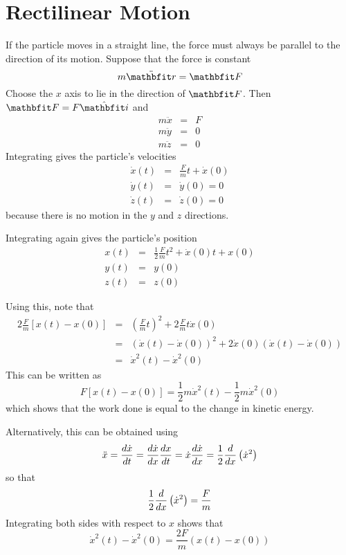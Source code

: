 \section{Rectilinear Motion}

If the particle moves in a straight line, the force must always be parallel
to the direction of its motion.  Suppose that the force is constant
$$m\ddot{\vect{r}}=\vect{F}$$
Choose the $x$ axis to lie in the direction of $\vect{F}$.  Then
$\vect{F}=F\ivect$ and
\begin{eqnarray*}
m\ddot{x}&=&F\\
m\ddot{y}&=&0\\
m\ddot{z}&=&0
\end{eqnarray*}
Integrating gives the particle's velocities 
\begin{eqnarray*}
\dot{x}(t)&=&\frac{F}{m}t+\dot{x}(0)\\
\dot{y}(t)&=&\dot{y}(0)=0\\
\dot{z}(t)&=&\dot{z}(0)=0
\end{eqnarray*}
because there is no motion in the $y$ and $z$ directions.

Integrating again gives the particle's position
\begin{eqnarray*}
x(t)&=&\frac{1}{2}\frac{F}{m}t^2+\dot{x}(0)t+x(0)\\
y(t)&=&y(0)\\
z(t)&=&z(0)
\end{eqnarray*}


Using this, note that
\begin{eqnarray*}
2\frac{F}{m}\left[x(t)-x(0)\right]
&=&\left(\frac{F}{m}t\right)^2+2\frac{F}{m}t\dot{x}(0) \\
&=&\left(\dot{x}(t)-\dot{x}(0)\right)^2
	+2\dot{x}(0)\left(\dot{x}(t)-\dot{x}(0)\right)\\
&=&\dot{x}^2(t)-\dot{x}^2(0)
\end{eqnarray*}
This can be written as
$$F\left[x(t)-x(0)\right]=\frac{1}{2}m\dot{x}^2(t)-\frac{1}{2}m\dot{x}^2(0)$$
which shows that the work done is equal to the change in kinetic energy.

Alternatively, this can be obtained using
$$\ddot{x}=\frac{d\dot{x}}{dt}=\frac{d\dot{x}}{dx}\frac{dx}{dt}
=\dot{x}\frac{d\dot{x}}{dx}=\frac{1}{2}\frac{d}{d{x}}\left(\dot{x}^2\right)$$
so that
$$\frac{1}{2}\frac{d}{d{x}}\left(\dot{x}^2\right)=\frac{F}{m}$$
Integrating both sides with respect to $x$ shows that
$$\dot{x}^2(t)-\dot{x}^2(0)=\frac{2F}{m}\left(x(t)-x(0)\right)$$

